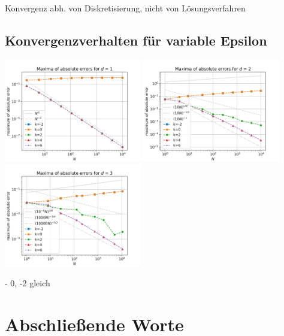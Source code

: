 \documentclass{scrartcl}
\begin{document}
Konvergenz abh. von Diskretisierung, nicht von Lösungsverfahren

\pagebreak
\subsection{Konvergenzverhalten für variable Epsilon}
{
  \centering
    \includegraphics[width=0.45\textwidth]{Grafiken/epsilon_d1}
    \includegraphics[width=0.45\textwidth]{Grafiken/epsilon_d2}
    \includegraphics[width=0.45\textwidth]{Grafiken/epsilon_d3}
    \vspace{-0.2cm}
}
\vspace{0.5cm}

- 0, -2 gleich

\pagebreak
\section{Abschließende Worte}

\pagebreak


\end{document}
